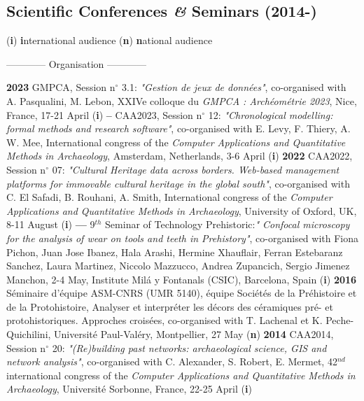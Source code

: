 \documentclass{article}
\begin{document}
\subsection*{Scientific Conferences \textit{\&} Seminars (2014-)}
\begin{center}(\textbf{i}) \textbf{i}nternational audience {\textbar} (\textbf{n}) \textbf{n}ational audience \end{center}
\smallbreak
\begin{center}------------ Organisation ------------\end{center}
\textbf{2023 }GMPCA, Session n$\mathrm{{}^\circ}$ 3.1: \textit{"Gestion de jeux de données"}, co-organised with A. Pasqualini, M. Lebon, XXIVe colloque du \textit{GMPCA : Archéométrie 2023}, Nice, France, 17-21 April (\textbf{i})
\smallbreak
\textbf{-- }CAA2023, Session n$\mathrm{{}^\circ}$ 12: \textit{"Chronological modelling: formal methods and research software"}, co-organised with E. Levy, F. Thiery, A. W. Mee, International congress of the \textit{Computer Applications and Quantitative Methods in Archaeology}, Amsterdam, Netherlands, 3-6 April (\textbf{i})
\smallbreak
\textbf{2022 }CAA2022, Session n$\mathrm{{}^\circ}$ 07: \textit{"Cultural Heritage data across borders. Web-based management platforms for immovable cultural heritage in the global south"}, co-organised with C. El Safadi, B. Rouhani, A. Smith, International congress of the \textit{Computer Applications and Quantitative Methods in Archaeology}, University of Oxford, UK, 8-11 August (\textbf{i})
\smallbreak
\textbf{--- }9${}^{th}$ Seminar of Technology Prehistoric:\textit{" Confocal microscopy for the analysis of wear on tools and teeth in Prehistory"}, co-organised with Fiona Pichon, Juan Jose Ibanez, Hala Arashi, Hermine Xhauflair, Ferran Estebaranz Sanchez, Laura Martinez, Niccolo Mazzucco, Andrea Zupancich, Sergio Jimenez Manchon, 2-4 May, Institute Milá y Fontanals (CSIC), Barcelona, Spain (\textbf{i})
\smallbreak
\textbf{2016 }S\'{e}minaire d'\'{e}quipe ASM-CNRS (UMR 5140), \'{e}quipe Soci\'{e}t\'{e}s de la Pr\'{e}histoire et de la Protohistoire, Analyser et interpr\'{e}ter les d\'{e}cors des c\'{e}ramiques pr\'{e}- et protohistoriques. Approches crois\'{e}es, co-organised with T. Lachenal et K. Peche-Quichilini, Universit\'{e} Paul-Val\'{e}ry, Montpellier, 27 May (\textbf{n})
\smallbreak
\textbf{2014 }CAA2014, Session n$\mathrm{{}^\circ}$ 20: \textit{"(Re)building past networks: archaeological science, GIS and network analysis"}, co-organised with C. Alexander, S. Robert, E. Mermet, 42${}^{nd}$ international congress of the \textit{Computer Applications and Quantitative Methods in Archaeology}, Universit\'{e} Sorbonne, France, 22-25 April (\textbf{i})
\bigbreak
\end{document}
